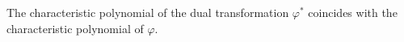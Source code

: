 The characteristic polynomial of the dual transformation $\varphi^*$ coincides with the characteristic polynomial of $\varphi$.
